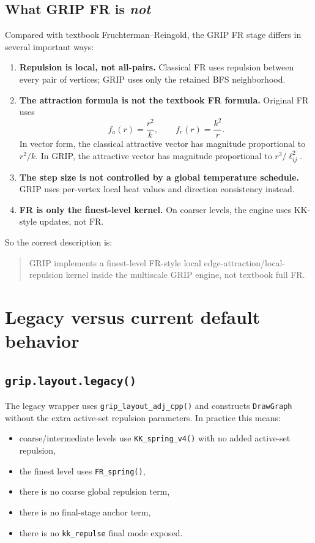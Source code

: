 \documentclass[11pt]{article}
\begin{document}
\subsection{What GRIP FR is \emph{not}}

Compared with textbook Fruchterman--Reingold, the GRIP FR stage differs in
several important ways:
\begin{enumerate}[leftmargin=1.5em]
\item \textbf{Repulsion is local, not all-pairs.} Classical FR uses repulsion
between every pair of vertices; GRIP uses only the retained BFS neighborhood.

\item \textbf{The attraction formula is not the textbook FR formula.} Original FR
uses
\[
f_a(r) = \frac{r^2}{k},
\qquad
f_r(r) = \frac{k^2}{r}.
\]
In vector form, the classical attractive vector has magnitude proportional to
$r^2/k$. In GRIP, the attractive vector has magnitude proportional to
$r^3/\ell_{ij}^2$.

\item \textbf{The step size is not controlled by a global temperature schedule.}
GRIP uses per-vertex local heat values and direction consistency instead.

\item \textbf{FR is only the finest-level kernel.} On coarser levels, the engine
uses KK-style updates, not FR.
\end{enumerate}

So the correct description is:
\begin{quote}
GRIP implements a finest-level FR-style local edge-attraction/local-repulsion
kernel inside the multiscale GRIP engine, not textbook full FR.
\end{quote}

\section{Legacy versus current default behavior}

\subsection{\texttt{grip.layout.legacy()}}

The legacy wrapper uses \texttt{grip\_layout\_adj\_cpp()} and constructs
\texttt{DrawGraph} without the extra active-set repulsion parameters. In practice
this means:
\begin{itemize}[leftmargin=1.5em]
\item coarse/intermediate levels use \texttt{KK\_spring\_v4()} with no added
active-set repulsion,
\item the finest level uses \texttt{FR\_spring()},
\item there is no coarse global repulsion term,
\item there is no final-stage anchor term,
\item there is no \texttt{kk\_repulse} final mode exposed.
\end{itemize}
\end{document}

